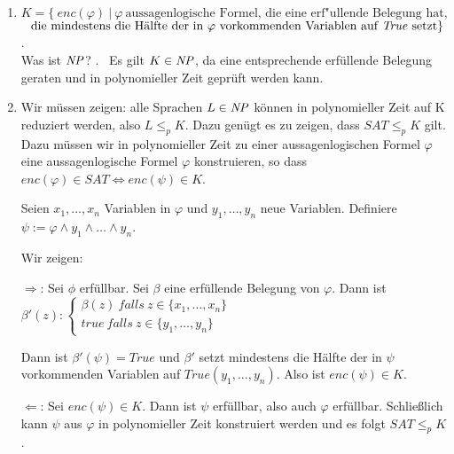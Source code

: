     \LOES
    \begin{enumerate}
        \item $K = \{\ enc(\varphi)\ |\ \varphi\ \text{aussagenlogische\ Formel,\ die\ eine\ erf"ullende\ Belegung\ hat,}$ \\
            $\text{\ \ die\ mindestens\ die\ Hälfte\ der\ in\ $\varphi$\ vorkommenden\ Variablen\ auf\ $\MT{True}$\ setzt} \}$. \\

            Was ist $\mathit{NP}$? . \
            Es gilt $K \in \mathit{NP}$, da eine entsprechende erfüllende Belegung geraten und in polynomieller Zeit geprüft werden kann.

        \item Wir müssen zeigen: alle Sprachen $L \in \mathit{NP}$ können in polynomieller Zeit auf K reduziert werden, also $L \leq_{p} K$. Dazu genügt es zu zeigen, dass $SAT \leq_{p} K$ gilt. Dazu müssen wir in polynomieller Zeit zu einer aussagenlogischen Formel $\varphi$ eine aussagenlogische Formel $\varphi$ konstruieren, so dass $enc(\varphi) \in SAT \Leftrightarrow enc(\psi) \in K$.

        Seien $x_{1}, \dots, x_{n}$ Variablen in $\varphi$ und $y_{1}, \dots, y_{n}$ neue Variablen. Definiere $\psi := \varphi \land y_{1} \land \dots \land y_{n}$.

        Wir zeigen:

        $\Rightarrow$: Sei $\phi$ erfüllbar. Sei $\beta$ eine erfüllende Belegung von $\varphi$. Dann ist $\beta'(z):{}
        \begin{cases}
            \beta(z)\ falls\ z \in \{ x_{1}, \dots, x_{n} \} \\
            true\ falls\ z \in \{ y_{1}, \dots, y_{n} \}
        \end{cases}$

        Dann ist $\beta'(\psi) = True$ und $\beta'$ setzt mindestens die Hälfte der in $\psi$ vorkommenden Variablen auf $True (y_{1},\dots,y_{n})$. Also ist $enc(\psi) \in K$.

        $\Leftarrow$: Sei $enc(\psi) \in K$. Dann ist $\psi$ erfüllbar, also auch $\varphi$ erfüllbar. Schließlich kann $\psi$ aus $\varphi$ in polynomieller Zeit konstruiert werden und es folgt $SAT \leq_{p} K$.
    \end{enumerate}


